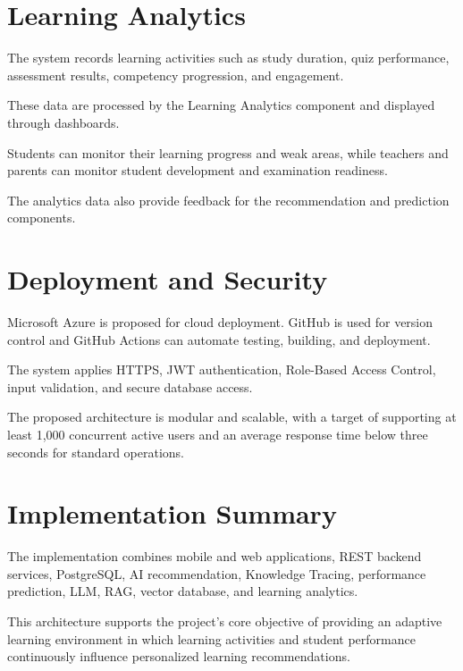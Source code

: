 \documentclass[12pt,a4paper]{report}
\begin{document}
\section{Learning Analytics}

The system records learning activities such as study duration,
quiz performance, assessment results, competency progression, and
engagement.

These data are processed by the Learning Analytics component and
displayed through dashboards.

Students can monitor their learning progress and weak areas, while
teachers and parents can monitor student development and examination
readiness.

The analytics data also provide feedback for the recommendation and
prediction components.


\section{Deployment and Security}

Microsoft Azure is proposed for cloud deployment. GitHub is used for
version control and GitHub Actions can automate testing, building,
and deployment.

The system applies HTTPS, JWT authentication, Role-Based Access
Control, input validation, and secure database access.

The proposed architecture is modular and scalable, with a target of
supporting at least 1,000 concurrent active users and an average
response time below three seconds for standard operations.


\section{Implementation Summary}

The implementation combines mobile and web applications, REST
backend services, PostgreSQL, AI recommendation, Knowledge Tracing,
performance prediction, LLM, RAG, vector database, and learning
analytics.

This architecture supports the project's core objective of providing
an adaptive learning environment in which learning activities and
student performance continuously influence personalized learning
recommendations.
\end{document}
